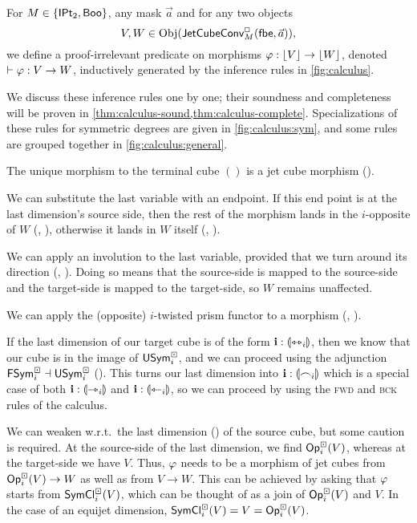 \documentclass[a4paper]{memoir}
\begin{document}
\begin{definition} \label{def:calculus}
	For $M \in \mathopen{}\left\{ {\mathsf{IPt}_2}, \mathsf{Boo} \right\}\mathclose{}$, any mask $\vec a$ and for any two objects
	\[
		V, W \in \mathrm{Obj}(\mathsf{JetCubeConv}^{\Box}_{M}\mathopen{}\left( {\mathsf{fbe}},\vec a \right)\mathclose{}),
	\]
	we define a proof-irrelevant predicate on morphisms $\varphi : \mathopen{}\left\lfloor V \right\rfloor\mathclose{} \to \mathopen{}\left\lfloor W \right\rfloor\mathclose{}$, denoted $\vdash \varphi : V \to W$, inductively generated by the inference rules in \cref{fig:calculus}.
\end{definition}
We discuss these inference rules one by one; their soundness and completeness will be proven in \cref{thm:calculus-sound,thm:calculus-complete}.
Specializations of these rules for symmetric degrees are given in \cref{fig:calculus:sym}, and some rules are grouped together in \cref{fig:calculus:general}.

The unique morphism to the terminal cube $()$ is a jet cube morphism ().

We can substitute the last variable with an endpoint. If this end point is at the last dimension's source side, then the rest of the morphism lands in the $i$-opposite of $W$ (, ), otherwise it lands in $W$ itself (, ).

We can apply an involution to the last variable, provided that we turn around its direction (, ). Doing so means that the source-side is mapped to the source-side and the target-side is mapped to the target-side, so $W$ remains unaffected.

We can apply the (opposite) $i$-twisted prism functor to a morphism (, ).

If the last dimension of our target cube is of the form $\mathbf{i} : {\llparenthesis \leftrightarrowtriangle_i \rrparenthesis}$, then we know that our cube is in the image of $\mathsf{USym}^\boxdot_i$, and we can proceed using the adjunction $\mathsf{FSym}^\boxdot_i \dashv \mathsf{USym}^\boxdot_i$ ().
This turns our last dimension into $\mathbf{i} : {\llparenthesis \frown_i \rrparenthesis}$ which is a special case of both $\mathbf{i} : {\llparenthesis \rightarrowtriangle_i \rrparenthesis}$ and $\mathbf{i} : {\llparenthesis \leftarrowtriangle_i \rrparenthesis}$, so we can proceed by using the \textsc{fwd} and \textsc{bck} rules of the calculus.

We can weaken w.r.t.\ the last dimension () of the source cube, but some caution is required. At the source-side of the last dimension, we find ${\mathsf{Op}}^\boxdot_i(V)$, whereas at the target-side we have $V$.
Thus, $\varphi$ needs to be a morphism of jet cubes from ${\mathsf{Op}}^\boxdot_i(V) \to W$ as well as from $V \to W$.
This can be achieved by asking that $\varphi$ starts from $\mathsf{SymCl}^\boxdot_i(V)$, which can be thought of as a join of ${\mathsf{Op}}^\boxdot_i(V)$ and $V$. In the case of an equijet dimension, $\mathsf{SymCl}^\boxdot_i(V) = V = {\mathsf{Op}}^\boxdot_i(V)$.
\end{document}
